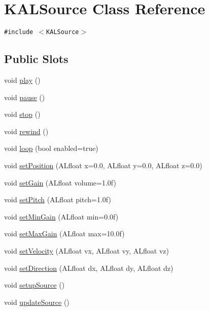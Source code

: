 \hypertarget{class_k_a_l_source}{
\section{KALSource Class Reference}
\label{class_k_a_l_source}
}
{\tt \#include $<$KALSource$>$}

\subsection*{Public Slots}
\begin{CompactItemize}
\item 
void \hyperlink{class_k_a_l_source_22573a4415c721d03693519b6ea0af96}{play} ()
\item 
void \hyperlink{class_k_a_l_source_5073e178991fd50af8344a7e64491634}{pause} ()
\item 
void \hyperlink{class_k_a_l_source_1796d7faf1bb7614111b3d7477c7c42b}{stop} ()
\item 
void \hyperlink{class_k_a_l_source_9c8b97bd784c3c362fd65276b9df03b4}{rewind} ()
\item 
void \hyperlink{class_k_a_l_source_12ee746221eb1e6ab36fe8c30f0d14d4}{loop} (bool enabled=true)
\item 
void \hyperlink{class_k_a_l_source_17250a60d4a3328cb9120cb4d9749187}{setPosition} (ALfloat x=0.0, ALfloat y=0.0, ALfloat z=0.0)
\item 
void \hyperlink{class_k_a_l_source_831dcd53e81bf704bf70974790298322}{setGain} (ALfloat volume=1.0f)
\item 
void \hyperlink{class_k_a_l_source_052f5b82f78a130af322334e2a340d0a}{setPitch} (ALfloat pitch=1.0f)
\item 
void \hyperlink{class_k_a_l_source_39fad788e416543df01548f717f21f0c}{setMinGain} (ALfloat min=0.0f)
\item 
void \hyperlink{class_k_a_l_source_579afe70c88657e7e09ce5ac29d001d1}{setMaxGain} (ALfloat max=10.0f)
\item 
void \hyperlink{class_k_a_l_source_911cddda3c690c5b85892003fe73dacd}{setVelocity} (ALfloat vx, ALfloat vy, ALfloat vz)
\item 
void \hyperlink{class_k_a_l_source_ec1cb92c08a1c4cf767afde34bb466a7}{setDirection} (ALfloat dx, ALfloat dy, ALfloat dz)
\item 
void \hyperlink{class_k_a_l_source_6f0c36e12e94b6fd3922aead49176576}{setupSource} ()
\item 
void \hyperlink{class_k_a_l_source_fb27d2f3bc35c3f3b0ee84616091656c}{updateSource} ()
\end{CompactItemize}
